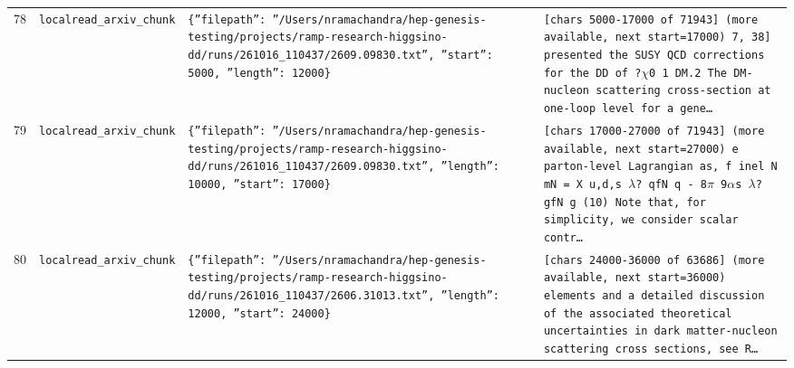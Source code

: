 \documentclass[11pt,a4paper]{article}
\begin{document}
\begin{longtable}{@{}p{}p{}p{}p{}@{}}
78 & \texttt{local}\newline\texttt{read\_\allowbreak{}arxiv\_\allowbreak{}chunk} & \texttt{\{''filepath'':\allowbreak{} ''/\allowbreak{}Users/\allowbreak{}nramachandra/\allowbreak{}hep-genesis-testing/\allowbreak{}projects/\allowbreak{}ramp-research-higgsino-dd/\allowbreak{}runs/\allowbreak{}261016\_\allowbreak{}110437/\allowbreak{}2609.09830.txt'',\allowbreak{} ''start'':\allowbreak{} 5000,\allowbreak{} ''length'':\allowbreak{} 12000\}\allowbreak{}} & \texttt{[chars 5000-17000 of 71943]\allowbreak{} (more available,\allowbreak{} next start=\allowbreak{}17000)\allowbreak{}  7,\allowbreak{} 38]\allowbreak{} presented the SUSY QCD corrections for the DD of ?$\chi$0 1 DM.2 The DM- nucleon scattering cross-section at one-loop level for a gene\ldots{}\allowbreak{}} \\
79 & \texttt{local}\newline\texttt{read\_\allowbreak{}arxiv\_\allowbreak{}chunk} & \texttt{\{''filepath'':\allowbreak{} ''/\allowbreak{}Users/\allowbreak{}nramachandra/\allowbreak{}hep-genesis-testing/\allowbreak{}projects/\allowbreak{}ramp-research-higgsino-dd/\allowbreak{}runs/\allowbreak{}261016\_\allowbreak{}110437/\allowbreak{}2609.09830.txt'',\allowbreak{} ''length'':\allowbreak{} 10000,\allowbreak{} ''start'':\allowbreak{} 17000\}\allowbreak{}} & \texttt{[chars 17000-27000 of 71943]\allowbreak{} (more available,\allowbreak{} next start=\allowbreak{}27000)\allowbreak{}  e parton-level Lagrangian as,\allowbreak{} f inel N mN =\allowbreak{} X u,\allowbreak{}d,\allowbreak{}s $\lambda$? qfN q - 8$\pi$ 9$\alpha$s $\lambda$? gfN g (10)\allowbreak{} Note that,\allowbreak{} for simplicity,\allowbreak{} we consider scalar contr\ldots{}\allowbreak{}} \\
80 & \texttt{local}\newline\texttt{read\_\allowbreak{}arxiv\_\allowbreak{}chunk} & \texttt{\{''filepath'':\allowbreak{} ''/\allowbreak{}Users/\allowbreak{}nramachandra/\allowbreak{}hep-genesis-testing/\allowbreak{}projects/\allowbreak{}ramp-research-higgsino-dd/\allowbreak{}runs/\allowbreak{}261016\_\allowbreak{}110437/\allowbreak{}2606.31013.txt'',\allowbreak{} ''length'':\allowbreak{} 12000,\allowbreak{} ''start'':\allowbreak{} 24000\}\allowbreak{}} & \texttt{[chars 24000-36000 of 63686]\allowbreak{} (more available,\allowbreak{} next start=\allowbreak{}36000)\allowbreak{}   elements and a detailed discussion of the associated theoretical uncertainties in dark matter-nucleon scattering cross sections,\allowbreak{} see R\ldots{}\allowbreak{}} \\

\end{longtable}
\end{document}
